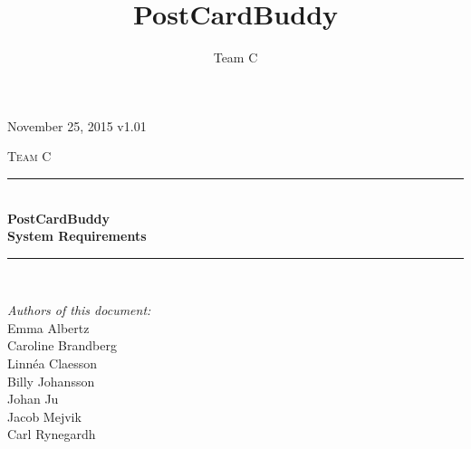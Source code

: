 \documentclass[10pt,a4paper]{article}
\title{PostCardBuddy}
\author{Team C}
\begin{document}
\begin{titlepage}
\newcommand{\HRule}{\rule{\linewidth}{0.5mm}}


\begin{flushright}
November 25, 2015 v1.01\\[3cm]
\end{flushright}


\centering
\textsc{\LARGE Team C}\\[0.5cm]

\HRule \\[0.4cm]
{ \huge \bfseries PostCardBuddy}\\[0.3cm]
{\Large \bfseries System Requirements}\\[0.4cm] %
\HRule \\[1.5cm]

\vfill
\begin{flushleft}
\textit{Authors of this document:}\\
Emma Albertz\\
Caroline Brandberg\\
Linnéa Claesson\\
Billy Johansson\\
Johan Ju\\
Jacob Mejvik\\
Carl Rynegardh
\end{flushleft}

\end{titlepage}



%



\setcounter{tocdepth}{2}
\tableofcontents
\newpage
{}

\end{document}
